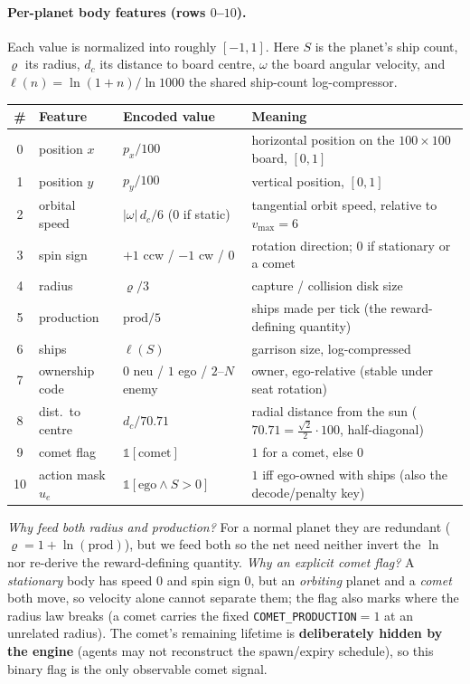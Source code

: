 \documentclass[11pt]{article}
\begin{document}
\paragraph{Per-planet body features (rows $0$--$10$).} Each value is normalized into roughly
$[-1,1]$. Here $S$ is the planet's ship count, $\varrho$ its radius, $d_c$ its distance to board
centre, $\omega$ the board angular velocity, and $\ell(n)=\ln(1+n)/\ln 1000$ the shared ship-count
log-compressor.
\begin{center}\small
\begin{tabular}{@{}clll@{}}
\toprule
\# & Feature & Encoded value & Meaning \\
\midrule
0  & position $x$        & $p_x/100$                            & horizontal position on the $100{\times}100$ board, $[0,1]$ \\
1  & position $y$        & $p_y/100$                            & vertical position, $[0,1]$ \\
2  & orbital speed       & $|\omega|\,d_c/6$ ($0$ if static)    & tangential orbit speed, relative to $v_{\max}{=}6$ \\
3  & spin sign           & $+1$ ccw / $-1$ cw / $0$             & rotation direction; $0$ if stationary or a comet \\
4  & radius              & $\varrho/3$                          & capture / collision disk size \\
5  & production          & $\mathrm{prod}/5$                    & ships made per tick (the reward-defining quantity) \\
6  & ships               & $\ell(S)$                            & garrison size, log-compressed \\
7  & ownership code      & $0$ neu / $1$ ego / $2$--$N$ enemy   & owner, ego-relative (stable under seat rotation) \\
8  & dist.\ to centre    & $d_c/70.71$                          & radial distance from the sun ($70.71{=}\tfrac{\sqrt2}{2}{\cdot}100$, half-diagonal) \\
9  & comet flag          & $\mathbb{1}[\text{comet}]$           & $1$ for a comet, else $0$ \\
10 & action mask $u_e$   & $\mathbb{1}[\text{ego}\wedge S{>}0]$ & $1$ iff ego-owned with ships (also the decode/penalty key) \\
\bottomrule
\end{tabular}
\end{center}

\noindent\emph{Why feed both radius and production?} For a normal planet they are redundant
($\varrho=1+\ln(\mathrm{prod})$), but we feed both so the net need neither invert the $\ln$ nor
re-derive the reward-defining quantity. \emph{Why an explicit comet flag?} A \emph{stationary} body
has speed $0$ and spin sign $0$, but an \emph{orbiting} planet and a \emph{comet} both move, so
velocity alone cannot separate them; the flag also marks where the radius law breaks (a comet carries
the fixed \texttt{COMET\_PRODUCTION}$=1$ at an unrelated radius). The comet's remaining lifetime is
\textbf{deliberately hidden by the engine} (agents may not reconstruct the spawn/expiry schedule), so
this binary flag is the only observable comet signal.
\end{document}
